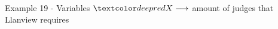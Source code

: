 \begin{frame}{Example 19 - Variables}
\Huge{
$\colora{X} \longrightarrow$
    amount of judges that Llanview requires
}
\end{frame}
